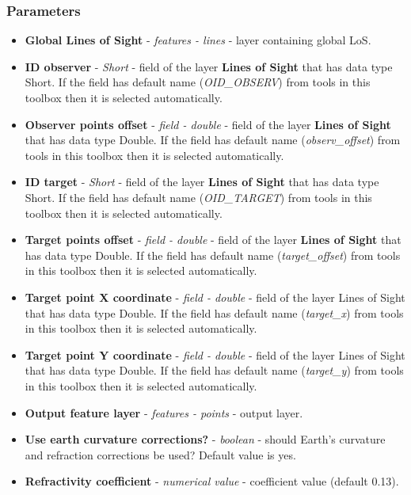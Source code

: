 \documentclass[]{article}
\begin{document}
\subsubsection{Parameters}
\begin{itemize}
	\item \textbf{Global Lines of Sight} - \textit{features - lines} - layer containing global LoS.
	\item \textbf{ID observer} - \textit{Short} - field of the layer \textbf{Lines of Sight} that has data type Short. If the field has default name (\textit{OID\_OBSERV}) from tools in this toolbox then it is selected automatically.
	\item \textbf{Observer points offset} - \textit{field - double} - field of the layer \textbf{Lines of Sight} that has data type Double. If the field has default name (\textit{observ\_offset}) from tools in this toolbox then it is selected automatically.
	\item \textbf{ID target} - \textit{Short} - field of the layer \textbf{Lines of Sight} that has data type Short. If the field has default name (\textit{OID\_TARGET}) from tools in this toolbox then it is selected automatically.
	\item \textbf{Target points offset} - \textit{field - double} - field of the layer \textbf{Lines of Sight} that has data type Double. If the field has default name (\textit{target\_offset}) from tools in this toolbox then it is selected automatically.
	\item \textbf{Target point X coordinate} - \textit{field - double} - field of the layer Lines of Sight that has data type Double. If the field has default name (\textit{target\_x}) from tools in this toolbox then it is selected automatically.
	\item \textbf{Target point Y coordinate} - \textit{field - double} - field of the layer Lines of Sight that has data type Double. If the field has default name (\textit{target\_y}) from tools in this toolbox then it is selected automatically.
	\item \textbf{Output feature layer} - \textit{features - points} - output layer.
	\item \textbf{Use earth curvature corrections?} - \textit{boolean} - should Earth's curvature and refraction corrections be used? Default value is yes.
	\item \textbf{Refractivity coefficient} - \textit{numerical value}  - coefficient value (default 0.13).
\end{itemize}
\end{document}
